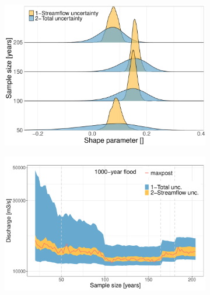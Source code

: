 \documentclass[11pt]{article}
\begin{document}
\begin{figure}[p]
            \begin{subfigure}{0.47\textwidth}
                \centering
                \includegraphics[width=\linewidth]{Figs/10d-Shape_4cases.pdf}
                \caption{}
                \label{subfig:Shape4cases}
            \end{subfigure}
            \begin{subfigure}{0.52\textwidth}
                \centering
                \includegraphics[width=\linewidth]{Figs/10e-Q1000SSize.pdf}
                \caption{}
                \label{subfig:SamplesQ1000}
            \end{subfigure}
            

\end{figure}
\end{document}
